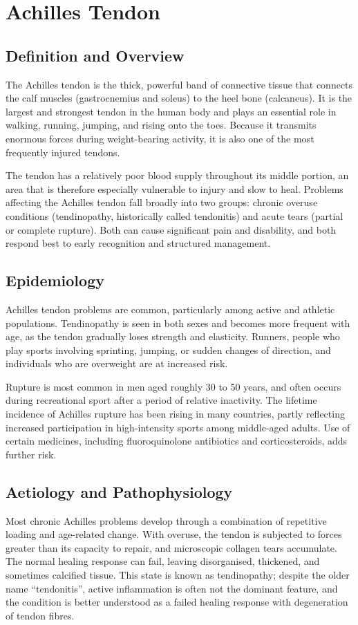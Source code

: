 \chapter{Achilles Tendon}

\section*{Definition and Overview}
The Achilles tendon is the thick, powerful band of connective tissue that connects the calf muscles (gastrocnemius and soleus) to the heel bone (calcaneus). It is the largest and strongest tendon in the human body and plays an essential role in walking, running, jumping, and rising onto the toes. Because it transmits enormous forces during weight-bearing activity, it is also one of the most frequently injured tendons.

The tendon has a relatively poor blood supply throughout its middle portion, an area that is therefore especially vulnerable to injury and slow to heal. Problems affecting the Achilles tendon fall broadly into two groups: chronic overuse conditions (tendinopathy, historically called tendonitis) and acute tears (partial or complete rupture). Both can cause significant pain and disability, and both respond best to early recognition and structured management.

\section*{Epidemiology}
Achilles tendon problems are common, particularly among active and athletic populations. Tendinopathy is seen in both sexes and becomes more frequent with age, as the tendon gradually loses strength and elasticity. Runners, people who play sports involving sprinting, jumping, or sudden changes of direction, and individuals who are overweight are at increased risk.

Rupture is most common in men aged roughly 30 to 50 years, and often occurs during recreational sport after a period of relative inactivity. The lifetime incidence of Achilles rupture has been rising in many countries, partly reflecting increased participation in high-intensity sports among middle-aged adults. Use of certain medicines, including fluoroquinolone antibiotics and corticosteroids, adds further risk.

\section*{Aetiology and Pathophysiology}
Most chronic Achilles problems develop through a combination of repetitive loading and age-related change. With overuse, the tendon is subjected to forces greater than its capacity to repair, and microscopic collagen tears accumulate. The normal healing response can fail, leaving disorganised, thickened, and sometimes calcified tissue. This state is known as tendinopathy; despite the older name ``tendonitis'', active inflammation is often not the dominant feature, and the condition is better understood as a failed healing response with degeneration of tendon fibres.

